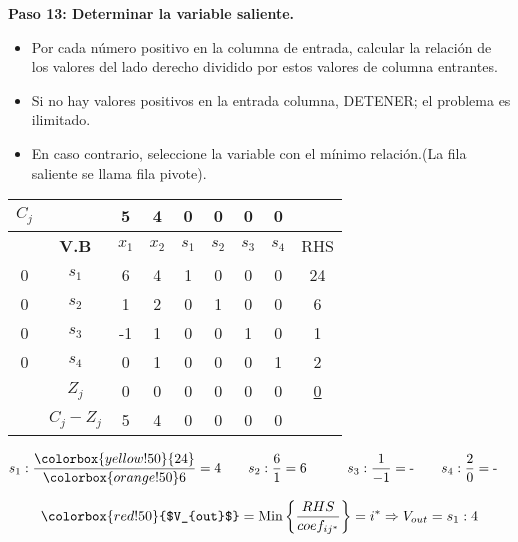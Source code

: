 \documentclass{templateNote}
\begin{document}
\textbf{Paso 13: Determinar la variable saliente.}
\begin{itemize}
    \item Por cada número positivo en la columna de entrada, calcular la relación de los valores del lado derecho dividido por estos valores de columna entrantes.
    \item Si no hay valores positivos en la entrada columna, DETENER; el problema es ilimitado.
    \item En caso contrario, seleccione la variable con el mínimo relación.(La fila saliente se llama fila pivote).
\end{itemize}
\begin{center}
    \begin{tabular}{|c|c|c|c|c|c|c|c|c|}
        \hline
        $C_j$ & & 5 & 4 & 0 & 0 & 0 & 0 & \\ \hline
        & \textbf{V.B} & $x_1$ & $x_2$ & $s_1$ & $s_2$ & $s_3$ & $s_4$ & RHS \\ \hline
        0 & $s_1$ & \cellcolor{orange!50}6 & 4 & 1 & 0 & 0 & 0 & \cellcolor{yellow!50}24 \\ \hline
        0 & $s_2$ & 1 & 2 & 0 & 1 & 0 & 0 & 6 \\ \hline
        0 & $s_3$ & -1 & 1 & 0 & 0 & 1 & 0 & 1 \\ \hline
        0 & $s_4$ & 0 & 1 & 0 & 0 & 0 & 1 & 2 \\ \hline
        & $Z_j$ & 0 & 0 & 0 & 0 & 0 & 0 & \underline{0} \\ \hline
        & $C_j - Z_j$ & 5 & 4 & 0 & 0 & 0 & 0 & \\ \hline
    \end{tabular}
\end{center}
\begin{align*}
    s_1: \frac{\colorbox{yellow!50}{24}}{\colorbox{orange!50}6} = 4 \qquad & s_2: \frac{6}{1} = 6 \qquad & s_3: \frac{1}{-1} = \text{-} \qquad & s_4: \frac{2}{0} = \text{-}
\end{align*}
\begin{center}
    \begin{equation*}
        \colorbox{red!50}{$V_{out}$} = \text{Min} \left\{ \frac{RHS}{coef_{ij^*}} \right\} = i^* \Rightarrow V_{out} = s_1 : 4
    \end{equation*}
\end{center}
\end{document}
